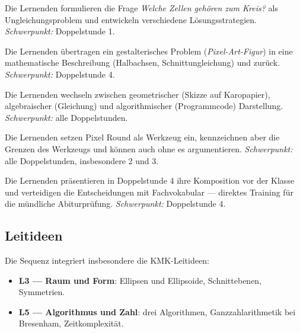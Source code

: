 \documentclass[12pt,a4paper]{scrartcl}
\newcommand{\acc}[1]{\textcolor{accent}{\textbf{#1}}}
\begin{document}
\begin{kompetenz}
Die Lernenden formulieren die Frage \emph{Welche Zellen gehören zum Kreis?} als Ungleichungsproblem und entwickeln verschiedene Lösungsstrategien. \emph{Schwerpunkt:} Doppelstunde 1.
\end{kompetenz}

\begin{kompetenz}
Die Lernenden übertragen ein gestalterisches Problem (\emph{Pixel-Art-Figur}) in eine mathematische Beschreibung (Halbachsen, Schnittungleichung) und zurück. \emph{Schwerpunkt:} Doppelstunde 4.
\end{kompetenz}

\begin{kompetenz}
Die Lernenden wechseln zwischen geometrischer (Skizze auf Karopapier), algebraischer (Gleichung) und algorithmischer (Programmcode) Darstellung. \emph{Schwerpunkt:} alle Doppelstunden.
\end{kompetenz}

\begin{kompetenz}
Die Lernenden setzen Pixel Round als Werkzeug ein, kennzeichnen aber die Grenzen des Werkzeugs und können auch ohne es argumentieren. \emph{Schwerpunkt:} alle Doppelstunden, insbesondere 2 und 3.
\end{kompetenz}

\begin{kompetenz}
Die Lernenden präsentieren in Doppelstunde 4 ihre Komposition vor der Klasse und verteidigen die Entscheidungen mit Fachvokabular --- direktes Training für die mündliche Abiturprüfung. \emph{Schwerpunkt:} Doppelstunde 4.
\end{kompetenz}

\subsection{Leitideen}

Die Sequenz integriert insbesondere die KMK-Leitideen:
\begin{itemize}[leftmargin=1.3em,itemsep=0.15em,topsep=0.3em]
  \item \acc{L3 --- Raum und Form}: Ellipsen und Ellipsoide, Schnittebenen, Symmetrien.
  \item \acc{L5 --- Algorithmus und Zahl}: drei Algorithmen, Ganzzahlarithmetik bei Bresenham, Zeitkomplexität.
\end{itemize}
\end{document}
